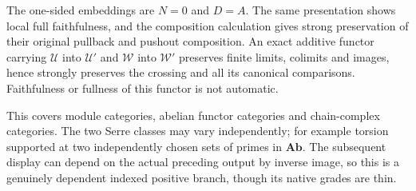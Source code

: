 \documentclass[11pt,a4paper]{article}
\theoremstyle{definition}
\newcommand{\Uclass}{\mathcal U}
\newcommand{\Wclass}{\mathcal W}
\newcommand{\Ab}{\mathbf{Ab}}
\begin{document}
The one-sided embeddings are $N=0$ and $D=A$. The same presentation shows
local full faithfulness, and the composition calculation gives strong
preservation of their original pullback and pushout composition. An exact
additive functor carrying $\Uclass$ into $\Uclass'$ and $\Wclass$ into
$\Wclass'$ preserves finite limits, colimits and images, hence strongly
preserves the crossing and all its canonical comparisons. Faithfulness or
fullness of this functor is not automatic.

This covers module categories, abelian functor categories and chain-complex
categories. The two Serre classes may vary independently; for example torsion
supported at two independently chosen sets of primes in $\Ab$. The subsequent
display can depend on the actual preceding output by inverse image, so this
is a genuinely dependent indexed positive branch, though its native grades
are thin.
\end{document}
